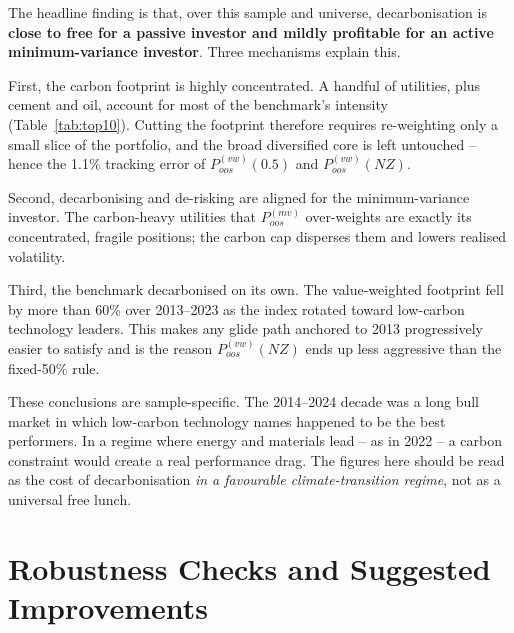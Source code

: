 \documentclass[11pt,a4paper]{article}
\newcommand{\pmv}{$P^{(mv)}_{oos}$}
\newcommand{\pvwh}{$P^{(vw)}_{oos}(0.5)$}
\newcommand{\pnz}{$P^{(vw)}_{oos}(NZ)$}
\begin{document}
The headline finding is that, over this sample and universe, decarbonisation is
\textbf{close to free for a passive investor and mildly profitable for an active
minimum-variance investor}. Three mechanisms explain this.

First, the carbon footprint is highly concentrated. A handful of utilities,
plus cement and oil, account for most of the benchmark's intensity
(Table~\ref{tab:top10}). Cutting the footprint therefore requires re-weighting
only a small slice of the portfolio, and the broad diversified core is left
untouched -- hence the 1.1\% tracking error of \pvwh{} and \pnz{}.

Second, decarbonising and de-risking are aligned for the minimum-variance
investor. The carbon-heavy utilities that \pmv{} over-weights are exactly its
concentrated, fragile positions; the carbon cap disperses them and lowers
realised volatility.

Third, the benchmark decarbonised on its own. The value-weighted footprint fell
by more than 60\% over 2013--2023 as the index rotated toward low-carbon
technology leaders. This makes any glide path anchored to 2013 progressively
easier to satisfy and is the reason \pnz{} ends up less aggressive than the
fixed-50\% rule.

These conclusions are sample-specific. The 2014--2024 decade was a long bull
market in which low-carbon technology names happened to be the best performers.
In a regime where energy and materials lead -- as in 2022 -- a carbon constraint
would create a real performance drag. The figures here should be read as the
cost of decarbonisation \emph{in a favourable climate-transition regime}, not as
a universal free lunch.

\section{Robustness Checks and Suggested Improvements}
\end{document}
